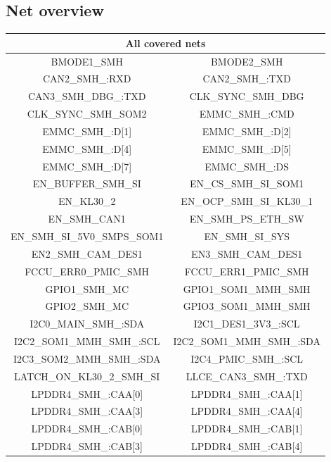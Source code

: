 \subsection{Net overview}
 \begin{center} 
  \begin{longtable}{|c|c|} 
   \hline 
    \multicolumn{2}{|c|}{All covered nets}\\ 
   \hline 
    BMODE1\_SMH & BMODE2\_SMH \\ \hline 
    CAN2\_SMH\_:RXD & CAN2\_SMH\_:TXD \\ \hline 
    CAN3\_SMH\_DBG\_:TXD & CLK\_SYNC\_SMH\_DBG \\ \hline 
    CLK\_SYNC\_SMH\_SOM2 & EMMC\_SMH\_:CMD \\ \hline 
    EMMC\_SMH\_:D[1] & EMMC\_SMH\_:D[2] \\ \hline 
    EMMC\_SMH\_:D[4] & EMMC\_SMH\_:D[5] \\ \hline 
    EMMC\_SMH\_:D[7] & EMMC\_SMH\_:DS \\ \hline 
    EN\_BUFFER\_SMH\_SI & EN\_CS\_SMH\_SI\_SOM1 \\ \hline 
    EN\_KL30\_2 & EN\_OCP\_SMH\_SI\_KL30\_1 \\ \hline 
    EN\_SMH\_CAN1 & EN\_SMH\_PS\_ETH\_SW \\ \hline 
    EN\_SMH\_SI\_5V0\_SMPS\_SOM1 & EN\_SMH\_SI\_SYS \\ \hline 
    EN2\_SMH\_CAM\_DES1 & EN3\_SMH\_CAM\_DES1 \\ \hline 
    FCCU\_ERR0\_PMIC\_SMH & FCCU\_ERR1\_PMIC\_SMH \\ \hline 
    GPIO1\_SMH\_MC & GPIO1\_SOM1\_MMH\_SMH \\ \hline 
    GPIO2\_SMH\_MC & GPIO3\_SOM1\_MMH\_SMH \\ \hline 
    I2C0\_MAIN\_SMH\_:SDA & I2C1\_DES1\_3V3\_:SCL \\ \hline 
    I2C2\_SOM1\_MMH\_SMH\_:SCL & I2C2\_SOM1\_MMH\_SMH\_:SDA \\ \hline 
    I2C3\_SOM2\_MMH\_SMH\_:SDA & I2C4\_PMIC\_SMH\_:SCL \\ \hline 
    LATCH\_ON\_KL30\_2\_SMH\_SI & LLCE\_CAN3\_SMH\_:TXD \\ \hline 
    LPDDR4\_SMH\_:CAA[0] & LPDDR4\_SMH\_:CAA[1] \\ \hline 
    LPDDR4\_SMH\_:CAA[3] & LPDDR4\_SMH\_:CAA[4] \\ \hline 
    LPDDR4\_SMH\_:CAB[0] & LPDDR4\_SMH\_:CAB[1] \\ \hline 
    LPDDR4\_SMH\_:CAB[3] & LPDDR4\_SMH\_:CAB[4] \\ \hline 

\end{longtable}
\end{center}
